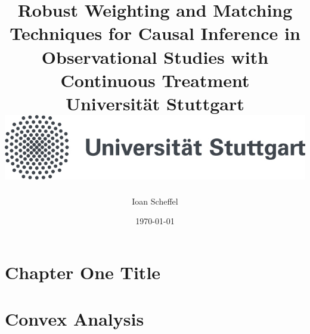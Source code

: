 \documentclass[12pt]{report}
\title{
{Robust Weighting and Matching Techniques for Causal Inference in Observational Studies with Continuous Treatment}\\
{\large Universität Stuttgart}\\
{\includegraphics{unistuttgart_logo_deutsch.jpg}}
}
\author{Ioan Scheffel}
\date{\today}
\begin{document}
\maketitle 

\tableofcontents 

\chapter{Chapter One Title}


\chapter{Convex Analysis}

\end{document}
